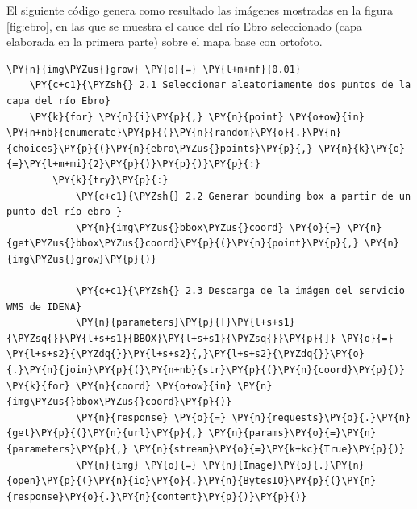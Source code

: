 El siguiente código genera como resultado las imágenes mostradas en la figura \ref{fig:ebro},
en las que se muestra el cauce del río Ebro seleccionado (capa elaborada en la primera parte) sobre el mapa base con ortofoto.
\newpage
\begin{tcolorbox}[breakable, size=fbox, boxrule=1pt, pad at break*=1mm,colback=cellbackground, colframe=cellborder, fontupper=\footnotesize]
    \begin{Verbatim}[commandchars=\\\{\}]
    \PY{n}{img\PYZus{}grow} \PY{o}{=} \PY{l+m+mf}{0.01}
    \PY{c+c1}{\PYZsh{} 2.1 Seleccionar aleatoriamente dos puntos de la capa del río Ebro}
    \PY{k}{for} \PY{n}{i}\PY{p}{,} \PY{n}{point} \PY{o+ow}{in} \PY{n+nb}{enumerate}\PY{p}{(}\PY{n}{random}\PY{o}{.}\PY{n}{choices}\PY{p}{(}\PY{n}{ebro\PYZus{}points}\PY{p}{,} \PY{n}{k}\PY{o}{=}\PY{l+m+mi}{2}\PY{p}{)}\PY{p}{)}\PY{p}{:}
        \PY{k}{try}\PY{p}{:}
            \PY{c+c1}{\PYZsh{} 2.2 Generar bounding box a partir de un punto del río ebro }
            \PY{n}{img\PYZus{}bbox\PYZus{}coord} \PY{o}{=} \PY{n}{get\PYZus{}bbox\PYZus{}coord}\PY{p}{(}\PY{n}{point}\PY{p}{,} \PY{n}{img\PYZus{}grow}\PY{p}{)}
    
            \PY{c+c1}{\PYZsh{} 2.3 Descarga de la imágen del servicio WMS de IDENA}
            \PY{n}{parameters}\PY{p}{[}\PY{l+s+s1}{\PYZsq{}}\PY{l+s+s1}{BBOX}\PY{l+s+s1}{\PYZsq{}}\PY{p}{]} \PY{o}{=} \PY{l+s+s2}{\PYZdq{}}\PY{l+s+s2}{,}\PY{l+s+s2}{\PYZdq{}}\PY{o}{.}\PY{n}{join}\PY{p}{(}\PY{n+nb}{str}\PY{p}{(}\PY{n}{coord}\PY{p}{)} \PY{k}{for} \PY{n}{coord} \PY{o+ow}{in} \PY{n}{img\PYZus{}bbox\PYZus{}coord}\PY{p}{)}
            \PY{n}{response} \PY{o}{=} \PY{n}{requests}\PY{o}{.}\PY{n}{get}\PY{p}{(}\PY{n}{url}\PY{p}{,} \PY{n}{params}\PY{o}{=}\PY{n}{parameters}\PY{p}{,} \PY{n}{stream}\PY{o}{=}\PY{k+kc}{True}\PY{p}{)}
            \PY{n}{img} \PY{o}{=} \PY{n}{Image}\PY{o}{.}\PY{n}{open}\PY{p}{(}\PY{n}{io}\PY{o}{.}\PY{n}{BytesIO}\PY{p}{(}\PY{n}{response}\PY{o}{.}\PY{n}{content}\PY{p}{)}\PY{p}{)}
    

\end{Verbatim}
\end{tcolorbox}
